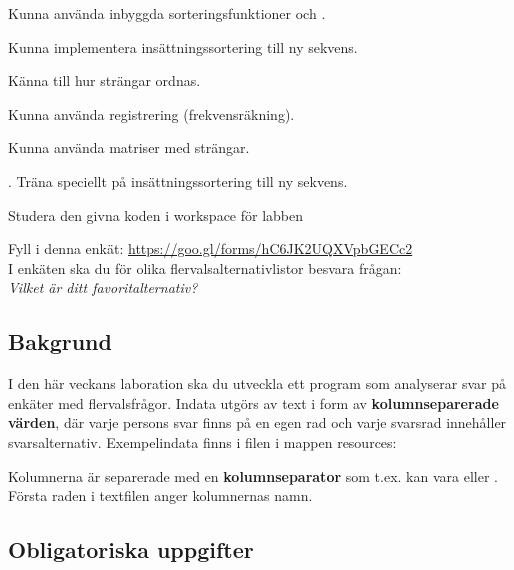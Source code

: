 
\Lab{\LabWeekTWELVE}

\begin{Goals}
\item Kunna använda inbyggda sorteringsfunktioner  och .
\item Kunna implementera insättningssortering till ny sekvens.
\item Känna till hur strängar ordnas.
\item Kunna använda registrering (frekvensräkning).
\item Kunna använda matriser med strängar.
\end{Goals}

\begin{Preparations}
\item {}. Träna speciellt på insättningssortering till ny sekvens.
\item \ReadTheLab
\item Studera den givna koden i workspace för labben 
\item Fyll i denna enkät: \url{https://goo.gl/forms/hC6JK2UQXVpbGECc2}  \\
I enkäten ska du för olika flervalsalternativlistor besvara frågan: \\ \textit{Vilket är ditt favoritalternativ?}
\end{Preparations}


\subsection{Bakgrund}

I den här veckans laboration ska du utveckla ett program som analyserar svar på enkäter med flervalsfrågor. Indata utgörs av text i form av \textbf{kolumnseparerade värden}, där varje persons svar finns på en egen rad och varje svarsrad innehåller svarsalternativ.
Exempelindata finns i filen  i mappen resources:

Kolumnerna är separerade med en \textbf{kolumnseparator} som t.ex. kan vara  eller . Första raden i textfilen anger kolumnernas namn.


\subsection{Obligatoriska uppgifter}

